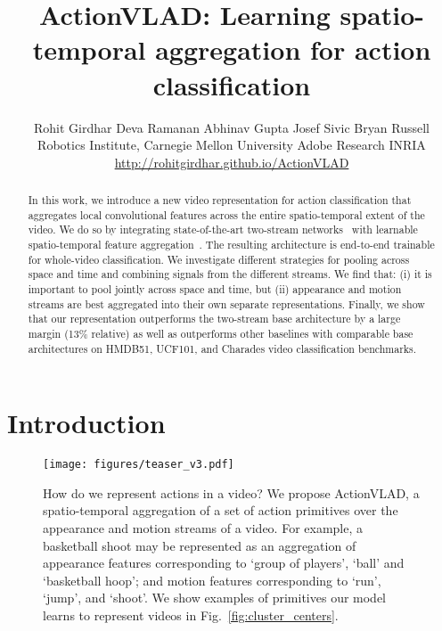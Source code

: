 \documentclass[10pt,twocolumn,letterpaper]{article}
\newcommand{\methodTag}[0]{ActionVLAD}
\begin{document}
\title{\methodTag{}: Learning spatio-temporal aggregation for action classification}

\author{Rohit Girdhar
\quad
Deva Ramanan
\quad
Abhinav Gupta
\quad
Josef Sivic
\quad
Bryan Russell
\\
Robotics Institute, Carnegie Mellon University
\quad
Adobe Research
\quad
INRIA \\
\small{\url{http://rohitgirdhar.github.io/ActionVLAD}}
}

\maketitle

\begin{abstract}
In this work, we introduce a new video representation for action classification that
aggregates local convolutional features across the entire spatio-temporal extent of the video. 
We do so by integrating state-of-the-art two-stream networks~\cite{Simonyan_14b}
with learnable spatio-temporal 
feature aggregation~\cite{Arandjelovic16}. 
The resulting architecture is end-to-end trainable for whole-video classification.
We investigate different strategies for pooling across space and time and combining signals from
the different streams. We find that:  (i) it is important to pool jointly across space and time, but (ii) appearance and motion streams are best aggregated into their own separate representations.   
Finally,  we  show  that  our representation  outperforms  the  two-stream  base  architecture by a large margin (13\% relative) as well as
outperforms other baselines with comparable base architectures on
HMDB51, UCF101, and Charades video classification benchmarks.
\end{abstract}


 \section{Introduction}

\begin{figure}
    \centering
    \texttt{[image: figures/teaser\_v3.pdf]}
        \caption{How do we represent actions in a video?
    We propose \methodTag{}, a spatio-temporal aggregation
    of a set of action primitives over the appearance and motion streams
    of a video.
                For example, a basketball shoot may be
    represented as an aggregation of appearance features corresponding to `group
    of players', `ball' and `basketball hoop'; and motion features
    corresponding to `run', `jump', and `shoot'.
    We show examples of primitives our model
    learns to represent videos in Fig.~\ref{fig:cluster_centers}.}
    \label{fig:teaser}
\end{figure}
\end{document}
